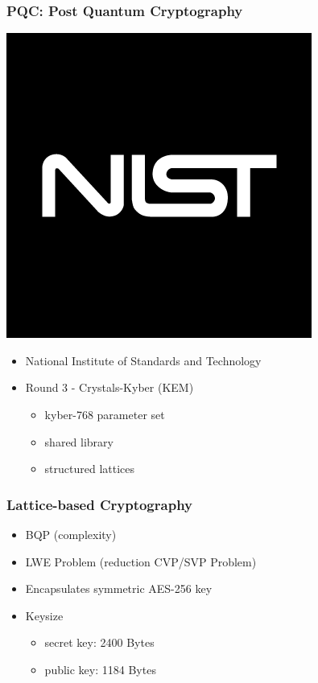 \documentclass{beamer}
\begin{document}
\begin{frame}
    \frametitle{PQC: Post Quantum Cryptography}
    \vspace{-0.5cm} %
    \begin{center}
        \includegraphics[scale=0.1]{resources/nist.png}
    \end{center}
    \vspace{-0.5cm} %
    \begin{itemize}
        \item National Institute of Standards and Technology
        \item Round 3 - Crystals-Kyber (KEM)
            \begin{itemize} 
                \item kyber-768 parameter set 
                \item shared library
                \item structured lattices 
            \end{itemize}
    \end{itemize}
\end{frame}


\begin{frame}
	\frametitle{Lattice-based Cryptography}
    \begin{itemize}
        \item BQP (complexity)
        \item LWE Problem (reduction CVP/SVP Problem)
        \item Encapsulates symmetric AES-256 key
        \item Keysize  
        \begin{itemize} 
            \item secret key: 2400 Bytes 
            \item public key: 1184 Bytes
        \end{itemize} 
    \end{itemize}
\end{frame}
\end{document}

